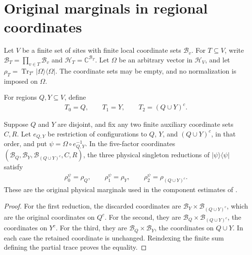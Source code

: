 \section{Original marginals in regional coordinates}

Let $V$ be a finite set of sites with finite local coordinate sets $\mathcal B_v$.
For $T\subseteq V$, write $\mathcal B_T=\prod_{v\in T}\mathcal B_v$ and
$\mathcal H_T=\mathbb C^{\mathcal B_T}$. Let $\Omega$ be an arbitrary vector
in $\mathcal H_V$, and let
$\rho_T=\operatorname{Tr}_{T^c}|\Omega\rangle\langle\Omega|$.
The coordinate sets may be empty, and no normalization is imposed on $\Omega$.

\begin{definition}
  \label{def:regional_physical_regions}
  \leanok
  For regions $Q,Y\subseteq V$, define
  \begin{align*}
    T_0=Q,\qquad T_1=Y,\qquad T_2=(Q\cup Y)^c.
  \end{align*}
\end{definition}

\begin{theorem}
  \label{thm:regional_physical_singleton_densities}
  \leanok
  Suppose $Q$ and $Y$ are disjoint, and fix any two finite auxiliary
  coordinate sets $C,R$. Let $e_{Q,Y}$ be restriction of configurations to
  $Q$, $Y$, and $(Q\cup Y)^c$, in that order, and put
  $\psi=\Omega\circ e_{Q,Y}^{-1}$. In the five-factor coordinates
  $(\mathcal B_Q,\mathcal B_Y,\mathcal B_{(Q\cup Y)^c},C,R)$, the three
  physical singleton reductions of $|\psi\rangle\langle\psi|$ satisfy
  \begin{align*}
    \rho^{\psi}_0=\rho_Q,\qquad
    \rho^{\psi}_1=\rho_Y,\qquad
    \rho^{\psi}_2=\rho_{(Q\cup Y)^c}.
  \end{align*}
  These are the original physical marginals used in the component estimates
  of \cite[Section~8]{OpenAI2026AreaLaw}.
\end{theorem}

\begin{proof}\leanok
  For the first reduction, the discarded coordinates are
  $\mathcal B_Y\times\mathcal B_{(Q\cup Y)^c}$, which are the original
  coordinates on $Q^c$. For the second, they are
  $\mathcal B_Q\times\mathcal B_{(Q\cup Y)^c}$, the coordinates on $Y^c$.
  For the third, they are $\mathcal B_Q\times\mathcal B_Y$, the coordinates
  on $Q\cup Y$. In each case the retained coordinate is unchanged.
  Reindexing the finite sum defining the partial trace proves the equality.
\end{proof}

